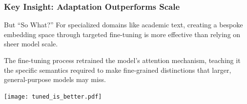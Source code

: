 \documentclass[aspectratio=169,10pt]{beamer}
\begin{document}
\begin{frame}
    \frametitle{Key Insight: Adaptation Outperforms Scale}
    
    \begin{alertblock}{But ``So What?''}
        For specialized domains like academic text, creating a bespoke embedding space through targeted fine-tuning is more effective than relying on sheer model scale.
        \vspace{1em}
        
        The fine-tuning process retrained the model's attention mechanism, teaching it the specific semantics required to make fine-grained distinctions that larger, general-purpose models may miss.
    \end{alertblock}

    \vfill
    \centering
    \texttt{[image: tuned\_is\_better.pdf]}
    
\end{frame}
\end{document}
